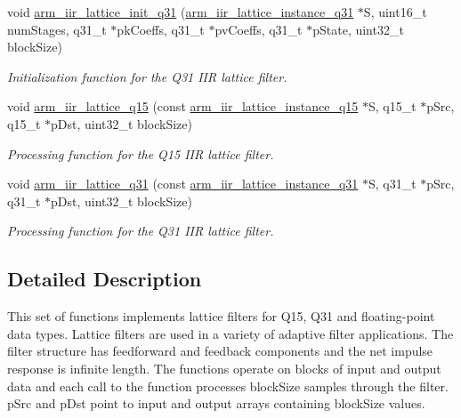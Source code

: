 \begin{DoxyCompactItemize}
void \hyperlink{group___i_i_r___lattice_gab686c14175581797d9c3ad7bf1d5cc1e}{arm\-\_\-iir\-\_\-lattice\-\_\-init\-\_\-q31} (\hyperlink{structarm__iir__lattice__instance__q31}{arm\-\_\-iir\-\_\-lattice\-\_\-instance\-\_\-q31} $\ast$S, uint16\-\_\-t num\-Stages, q31\-\_\-t $\ast$pk\-Coeffs, q31\-\_\-t $\ast$pv\-Coeffs, q31\-\_\-t $\ast$p\-State, uint32\-\_\-t block\-Size)
\begin{DoxyCompactList}\small\item\em Initialization function for the Q31 I\-I\-R lattice filter. \end{DoxyCompactList}\item 
void \hyperlink{group___i_i_r___lattice_gaeb9e9599a288832ed123183eaa8b294a}{arm\-\_\-iir\-\_\-lattice\-\_\-q15} (const \hyperlink{structarm__iir__lattice__instance__q15}{arm\-\_\-iir\-\_\-lattice\-\_\-instance\-\_\-q15} $\ast$S, q15\-\_\-t $\ast$p\-Src, q15\-\_\-t $\ast$p\-Dst, uint32\-\_\-t block\-Size)
\begin{DoxyCompactList}\small\item\em Processing function for the Q15 I\-I\-R lattice filter. \end{DoxyCompactList}\item 
void \hyperlink{group___i_i_r___lattice_ga123b26fa9156cd8d3622dd85931741ed}{arm\-\_\-iir\-\_\-lattice\-\_\-q31} (const \hyperlink{structarm__iir__lattice__instance__q31}{arm\-\_\-iir\-\_\-lattice\-\_\-instance\-\_\-q31} $\ast$S, q31\-\_\-t $\ast$p\-Src, q31\-\_\-t $\ast$p\-Dst, uint32\-\_\-t block\-Size)
\begin{DoxyCompactList}\small\item\em Processing function for the Q31 I\-I\-R lattice filter. \end{DoxyCompactList}\end{DoxyCompactItemize}


\subsection{Detailed Description}
This set of functions implements lattice filters for Q15, Q31 and floating-\/point data types. Lattice filters are used in a variety of adaptive filter applications. The filter structure has feedforward and feedback components and the net impulse response is infinite length. The functions operate on blocks of input and output data and each call to the function processes {\ttfamily block\-Size} samples through the filter. {\ttfamily p\-Src} and {\ttfamily p\-Dst} point to input and output arrays containing {\ttfamily block\-Size} values.

